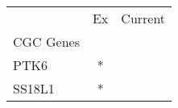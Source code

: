 \begin{tabular}{lcc}
\toprule
{} & Ex & Current \\
CGC Genes &    &         \\
\midrule
PTK6      &  * &         \\
SS18L1    &  * &         \\
\bottomrule
\end{tabular}
